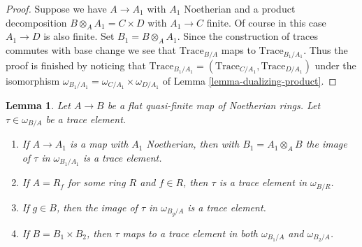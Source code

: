 \documentclass{stacks-project}
\theoremstyle{plain}
\newtheorem{lemma}[subsection]{Lemma}
\theoremstyle{definition}
\theoremstyle{remark}
\numberwithin{equation}{subsection}
\begin{document}
\begin{proof}
Suppose we have $A \to A_1$ with $A_1$ Noetherian and
a product decomposition $B \otimes_A A_1 = C \times D$ with $A_1 \to C$
finite. Of course in this case $A_1 \to D$ is also finite.
Set $B_1 = B \otimes_A A_1$.
Since the construction of traces commutes with base change
we see that $\text{Trace}_{B/A}$ maps to $\text{Trace}_{B_1/A_1}$.
Thus the proof is finished by noticing that
$\text{Trace}_{B_1/A_1} = (\text{Trace}_{C/A_1}, \text{Trace}_{D/A_1})$
under the isomorphism
$\omega_{B_1/A_1} = \omega_{C/A_1} \times \omega_{D/A_1}$
of Lemma \ref{lemma-dualizing-product}.
\end{proof}

\begin{lemma}
\label{lemma-trace-base-change}
Let $A \to B$ be a flat quasi-finite map of Noetherian rings.
Let $\tau \in \omega_{B/A}$ be a trace element.
\begin{enumerate}
\item If $A \to A_1$ is a map with $A_1$ Noetherian, then with
$B_1 = A_1 \otimes_A B$ the image of $\tau$ in $\omega_{B_1/A_1}$ is a
trace element.
\item If $A = R_f$ for some ring $R$ and $f \in R$, then
$\tau$ is a trace element in $\omega_{B/R}$.
\item If $g \in B$, then the image of $\tau$ in $\omega_{B_g/A}$
is a trace element.
\item If $B = B_1 \times B_2$, then $\tau$ maps to a trace element
in both $\omega_{B_1/A}$ and $\omega_{B_2/A}$.
\end{enumerate}
\end{lemma}
\end{document}
